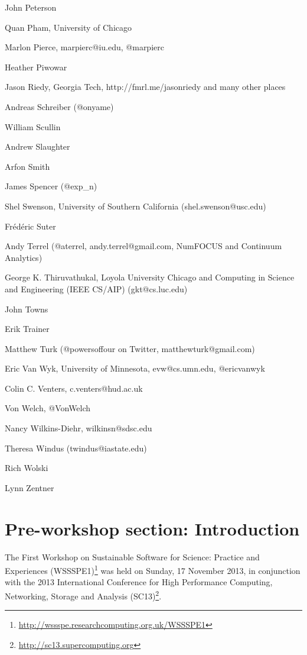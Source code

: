 \documentclass[11pt, oneside]{amsart}
\begin{document}
John Peterson

Quan Pham, University of Chicago

Marlon Pierce, marpierc@iu.edu, @marpierc

Heather Piwowar

Jason Riedy, Georgia Tech, http://fmrl.me/jasonriedy and many other places

Andreas Schreiber (@onyame)

William Scullin

Andrew Slaughter

Arfon Smith

James Spencer (@exp\_n)

Shel Swenson, University of Southern California (shel.swenson@usc.edu)

Fr\'{e}d\'{e}ric Suter

Andy Terrel (@aterrel, andy.terrel@gmail.com, NumFOCUS and Continuum Analytics)

George K. Thiruvathukal, Loyola University Chicago and Computing in Science and Engineering (IEEE CS/AIP) (gkt@cs.luc.edu)

John Towns

Erik Trainer

Matthew Turk (@powersoffour on Twitter, matthewturk@gmail.com)

Eric Van Wyk, University of Minnesota, evw@cs.umn.edu, @ericvanwyk

Colin C. Venters, c.venters@hud.ac.uk

Von Welch, @VonWelch

Nancy Wilkins-Diehr, wilkinsn@sdsc.edu

Theresa Windus (twindus@iastate.edu)

Rich Wolski

Lynn Zentner



\section{Pre-workshop section: Introduction}

The First Workshop on Sustainable Software for Science: Practice and Experiences (WSSSPE1)\footnote{\url{http://wssspe.researchcomputing.org.uk/WSSSPE1}} was held on Sunday, 17 November 2013, in conjunction with the 2013 International Conference for High Performance Computing, Networking, Storage and Analysis (SC13)\footnote{\url{http://sc13.supercomputing.org}}.
\end{document}
